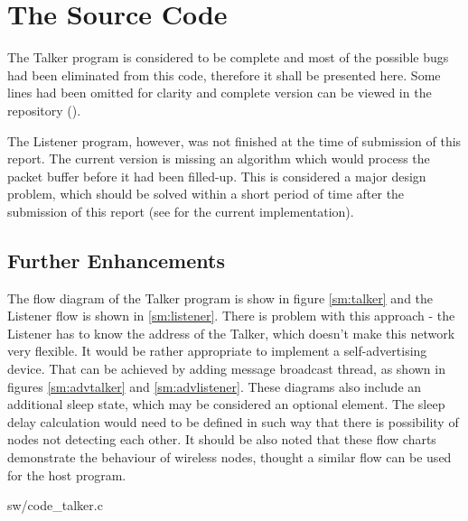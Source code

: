 \section{The Source Code}

  The Talker program is considered to be complete
 and most of the possible bugs had been eliminated
 from this code, therefore it shall be presented
 here. Some lines had been omitted for clarity and
 complete version can be viewed in the repository
 ().


  The Listener program, however, was not finished
 at the time of submission of this report. The
 current version is missing an algorithm which
 would process the packet buffer before it had
 been filled-up. This is considered a major design
 problem, which should be solved within a short
 period of time after the submission of this report
 (see 
 for the current implementation).


\subsection{Further Enhancements}

  The flow diagram of the Talker program is show in
 figure \ref{sm:talker} and the Listener flow is
 shown in \ref{sm:listener}. There is problem with
 this approach - the Listener has to know the address
 of the Talker, which doesn't make this network
 very flexible. It would be rather appropriate to
 implement a self-advertising device. That can be
 achieved by adding message broadcast thread, as shown
 in figures \ref{sm:advtalker} and \ref{sm:advlistener}.
 These diagrams also include an additional sleep state,
 which may be considered an optional element. The
 sleep delay calculation would need to be defined in
 such way that there is possibility of nodes not detecting
 each other. It should be also noted that these flow
 charts demonstrate the behaviour of wireless nodes,
 thought a similar flow can be used for the host program.


\pagebreak

{sw/code_talker.c}

